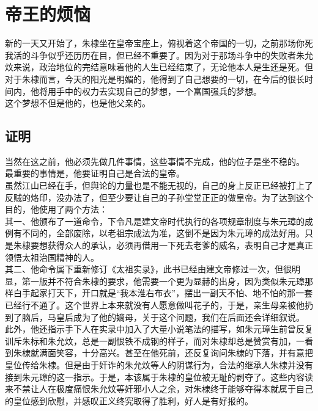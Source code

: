 \section{帝王的烦恼}
\ifnum{}
	\begin{multicols}{\theparacolNo}
\fi

新的一天又开始了，朱棣坐在皇帝宝座上，俯视着这个帝国的一切，之前那场你死我活的斗争似乎还历历在目，但已经不重要了。因为对于那场斗争中的失败者朱允炆来说，政治地位的完结意味着他的人生已经结束了，无论他本人是生还是死。但对于朱棣而言，今天的阳光是明媚的，他得到了自己想要的一切，在今后的很长时间内，他将用手中的权力去实现自己的梦想，一个富国强兵的梦想。\\

这个梦想不但是他的，也是他父亲的。\\

\subsection{证明}
当然在这之前，他必须先做几件事情，这些事情不完成，他的位子是坐不稳的。\\

最重要的事情是，他要证明自己是合法的皇帝。\\

虽然江山已经在手，但舆论的力量也是不能无视的，自己的身上反正已经被打上了反贼的烙印，没办法了，但至少要让自己的子孙堂堂正正的做皇帝。为了达到这个目的，他使用了两个方法：\\

其一、他颁布了一道命令，下令凡是建文帝时代执行的各项规章制度与朱元璋的成例有不同的，全部废除，以老祖宗成法为准，这倒不是因为朱元璋的成法好用。只是朱棣要想获得众人的承认，必须再借用一下死去老爹的威名，表明自己才是真正领悟太祖治国精神的人。\\

其二、他命令属下重新修订《太祖实录》，此书已经由建文帝修过一次，但很明显，第一版并不符合朱棣的要求，他需要一个更为显赫的出身，因为类似朱元璋那样白手起家打天下，开口就是“我本淮右布衣”，摆出一副天不怕、地不怕的那一套已经行不通了。这个世界上本来就没有人愿意做叫花子的，于是，亲生母亲被他扔到了脑后，马皇后成为了他的嫡母，关于这个问题，我们在后面还会详细叙说。\\

此外，他还指示手下人在实录中加入了大量小说笔法的描写，如朱元璋生前曾反复训斥朱标和朱允炆，总是一副恨铁不成钢的样子，而对朱棣却总是赞赏有加，一看到朱棣就满面笑容，十分高兴。甚至在他死前，还反复询问朱棣的下落，并有意把皇位传给朱棣。但是由于奸诈的朱允炆等人的阴谋行为，合法的继承人朱棣并没有接到朱元璋的这一指示。于是，本该属于朱棣的皇位被无耻的剥夺了。这些内容读来不禁让人在极度痛恨朱允炆等奸邪小人之余，对朱棣终于能够夺得本就属于自己的皇位感到欣慰，并感叹正义终究取得了胜利，好人是有好报的。\\


\end{multicols}
